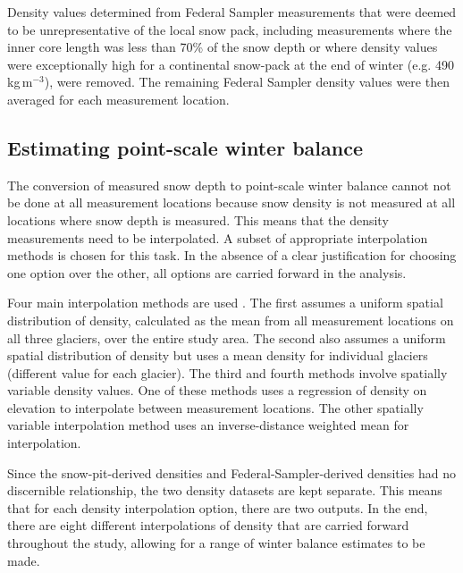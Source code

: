 \documentclass{sfuthesis}
\begin{document}
Density values determined from Federal Sampler measurements that were deemed to be unrepresentative of the local snow pack, including measurements where the inner core length was less than 70\% of the snow depth or where density values were exceptionally high {\color{red} for a continental snow-pack at the end of winter} (e.g. 490\,kg\,m$^{-3}$), were removed. The remaining Federal Sampler density values were then averaged for each measurement location.

\subsection{Estimating point-scale winter balance}
\label{sec:swe_calc}

The conversion of measured snow depth to point-scale winter balance cannot not be done at all measurement locations because snow density is not measured at all locations where snow depth is measured. This means that the density measurements need to be interpolated. A subset of appropriate interpolation methods is chosen for this task. In the absence of a clear justification for choosing one option over the other, all options are carried forward in the analysis. 

Four main interpolation methods are used \citep{McGrath2015, Elder1991}. The first assumes a uniform spatial distribution of density, calculated as the mean from all measurement locations on all three glaciers, over the entire study area. The second  also assumes a uniform spatial distribution of density but uses a mean density for individual glaciers (different value for each glacier). The third and fourth methods involve spatially variable density values. One of these methods uses a regression of density on elevation to interpolate between measurement locations. The other spatially variable interpolation method uses an inverse-distance weighted mean for interpolation. 

Since the snow-pit-derived densities and Federal-Sampler-derived densities had no discernible relationship, the two density datasets are kept separate. This means that for each density interpolation option, there are two outputs. In the end, there are eight different interpolations of density that are carried forward throughout the study, allowing for a range of winter balance estimates to be made. 
\end{document}
